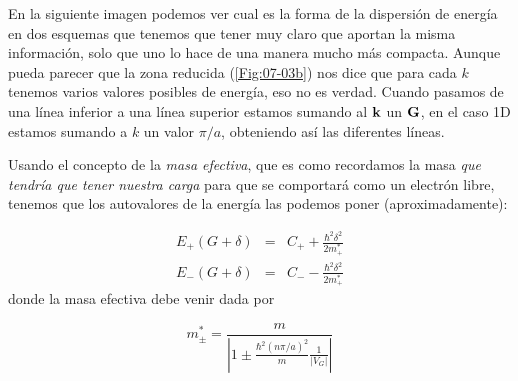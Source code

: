 En la siguiente imagen podemos ver cual es la forma de la dispersión de energía en dos esquemas que tenemos que tener muy claro que aportan la misma información, solo que uno lo hace de una manera mucho más compacta. Aunque pueda parecer que la zona reducida (\ref{Fig:07-03b}) nos dice que para cada $k$ tenemos varios valores posibles de energía, eso no es verdad. Cuando pasamos de una línea inferior a una línea superior estamos sumando al $\mathbf{k}$ un $\mathbf{G}$, en el caso 1D estamos sumando a $k$ un valor $\pi/a$, obteniendo así las diferentes líneas. 


Usando el concepto de la \textit{masa efectiva}, que es como recordamos la masa \textit{que tendría que tener nuestra carga} para que se comportará como un electrón libre, tenemos que los autovalores de la energía las podemos poner (aproximadamente):

\begin{eqnarray}
	E_+ (G+\delta) & = & C_+ + \frac{\hbar^2 \delta^2}{2m_+^*} \\
	E_- (G+\delta) & = & C_- - \frac{\hbar^2 \delta^2}{2m_+^*} 
\end{eqnarray}
donde la masa efectiva debe venir dada por

\begin{equation}
	m_{\pm}^* = \frac{m}{\left|1 \pm \frac{\hbar^2 (n\pi/a)^2}{m} \frac{1}{|V_G|} \right| }
\end{equation}


